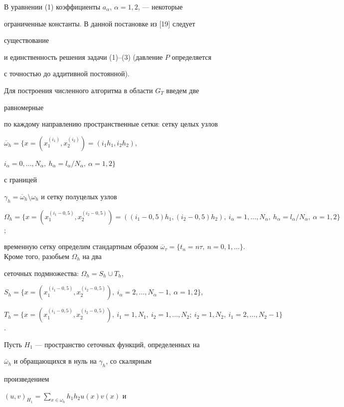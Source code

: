 В уравнении (1) коэффициенты $a_\alpha$, $\alpha=1,2$, --- некоторые


ограниченные константы. В данной постановке из [19] следует


существование


и единственность решения задачи (1)--(3) (давление $P$ определяется


с точностью до аддитивной постоянной).





Для построения численного алгоритма в области $G_T$ введем две


равномерные


по каждому направлению пространственные сетки: сетку целых узлов


$\overline\omega_h=\{x=(x_1^{(i_1)},x_2^{(i_2)})=(i_1h_1,i_2h_2),$


$i_\alpha=0,\dotsc,N_\alpha,\ h_\alpha=l_\alpha/N_\alpha,\ \alpha=1,2\}$


с границей


$\gamma_h=\overline\omega_h\setminus\omega_h$ и сетку полуцелых узлов


$\Omega_h=\{x=(x_1^{(i_1-0,5)},x_2^{(i_2-0,5)})=((i_1-0,5)h_1,(i_2-0,5)h_2),\ 


i_\alpha=1,\dotsc,N_\alpha,\ h_\alpha=l_\alpha/N_\alpha,\ \alpha=1,2\}$;


временную сетку определим стандартным образом $\overline\omega_\tau=


\{t_n=n\tau,\ n=0,1,\dotsc\}$. Кроме того, разобьем $\Omega_h$ на два


сеточных подмножества: $\Omega_h=S_h\cup T_h$,


$S_h=\{x=(x_1^{(i_1-0,5)},x_2^{(i_2-0,5)}),\


i_\alpha=2,\dotsc,N_\alpha-1,\ \alpha=1,2\}$,


$T_h=\{x=(x_1^{(i_1-0,5)},x_2^{(i_2-0,5)}),\ i_1=1,N_1,\


i_2=1,\dotsc,N_2;\


i_2=1,N_2,\ i_1=2,\dotsc,N_2-1\}$.





Пусть $H_1$ --- пространство сеточных функций, определенных на


$\overline\omega_h$ и обращающихся в нуль на $\gamma_h$, со скалярным


произведением


$(u,v)_{H_1}=\sum\limits_{x\in\omega_h}h_1h_2u(x)v(x)$ и



